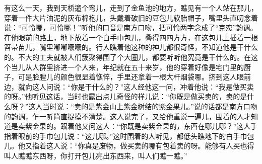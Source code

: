 \documentclass[12pt,UTF8]{ctexbook}
\begin{document}
有这么一天，我到天桥遛个弯儿，走到了金鱼池的地方，瞧见有一个人站在那儿，穿着一件大片油泥的灰布棉袍儿，头戴着破旧的豆包儿软胎帽子，嘴里头直叨念着说：“可怜哪，可怜哪！”听他的口音是南方口吻，把可怜两字念成了“克恋”韵调。在他眼前的路上，地下放着一个白手巾包儿，叠得四四方方，在这包儿上插着一根笤帚苗儿，嘴里嘟嘟囔囔的。行人瞧着他这种的神儿都很奇怪，不知道他是干什么的。不大的工夫就被人们簇聚得围了个大圈儿，都要听听他究竟是干什么的。在这个当儿从人群里挤进一个人来，年纪就在五十来岁，他的穿着好像是宅门里的厨子，可是脸膛儿的颜色很显着憔悴，手里还拿着一根大杆烟袋哪。挤到这人眼前边，就向这人问说：“你是干什么的？”这人经他这一问，冲着他说：“我是做买卖的呀。”他听见这话，当时也露出点儿奇怪的样儿说：“你既是做买卖的，卖的是什么呀？”这人当时说：“卖的是紫金山上紫金树结的紫金果儿。”说的话都是南方口吻的韵调，乍一听简直捉摸不清楚。这人说完了，又给他重说一遍儿，围着的人才知道是卖紫金果的。跟着他又问这人：“你既是卖紫金果的，东西在哪儿哪？”这人手指着眼前的手巾包儿说：“这儿哪。”这时围着的人听见，都低头瞧地下的白手巾包儿。他又指着这人说：“你真是废物，做买卖的哪有包着卖的呀。能够有人买也得叫人瞧瞧东西呀，你打开包儿亮出东西来，叫人们瞧一瞧。”
\end{document}
